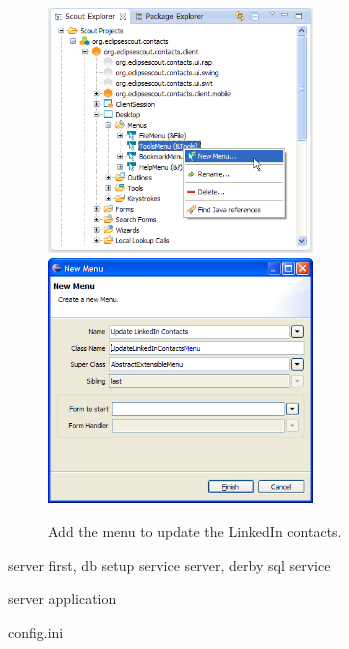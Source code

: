 \documentclass[a4paper,10pt,twoside]{book}
\begin{document}
\begin{figure}
\includegraphics[width=7cm]{new_menu_updatecontacts_contextmenu.png} \hspace{5mm}
\includegraphics[width=7cm]{new_menu_updatecontacts.png}
\caption{Add the menu to update the LinkedIn contacts.}
\end{figure}

server first, db setup service
server, derby sql service

server application

config.ini

\ifx\wholebook\relax\else
   
   
\end{document}
